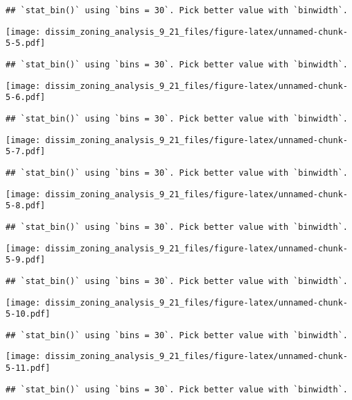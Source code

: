 \documentclass[
]{article}
\begin{document}
\begin{verbatim}
## `stat_bin()` using `bins = 30`. Pick better value with `binwidth`.
\end{verbatim}

\texttt{[image: dissim\_zoning\_analysis\_9\_21\_files/figure-latex/unnamed-chunk-5-5.pdf]}

\begin{verbatim}
## `stat_bin()` using `bins = 30`. Pick better value with `binwidth`.
\end{verbatim}

\texttt{[image: dissim\_zoning\_analysis\_9\_21\_files/figure-latex/unnamed-chunk-5-6.pdf]}

\begin{verbatim}
## `stat_bin()` using `bins = 30`. Pick better value with `binwidth`.
\end{verbatim}

\texttt{[image: dissim\_zoning\_analysis\_9\_21\_files/figure-latex/unnamed-chunk-5-7.pdf]}

\begin{verbatim}
## `stat_bin()` using `bins = 30`. Pick better value with `binwidth`.
\end{verbatim}

\texttt{[image: dissim\_zoning\_analysis\_9\_21\_files/figure-latex/unnamed-chunk-5-8.pdf]}

\begin{verbatim}
## `stat_bin()` using `bins = 30`. Pick better value with `binwidth`.
\end{verbatim}

\texttt{[image: dissim\_zoning\_analysis\_9\_21\_files/figure-latex/unnamed-chunk-5-9.pdf]}

\begin{verbatim}
## `stat_bin()` using `bins = 30`. Pick better value with `binwidth`.
\end{verbatim}

\texttt{[image: dissim\_zoning\_analysis\_9\_21\_files/figure-latex/unnamed-chunk-5-10.pdf]}

\begin{verbatim}
## `stat_bin()` using `bins = 30`. Pick better value with `binwidth`.
\end{verbatim}

\texttt{[image: dissim\_zoning\_analysis\_9\_21\_files/figure-latex/unnamed-chunk-5-11.pdf]}

\begin{verbatim}
## `stat_bin()` using `bins = 30`. Pick better value with `binwidth`.
\end{verbatim}
\end{document}
